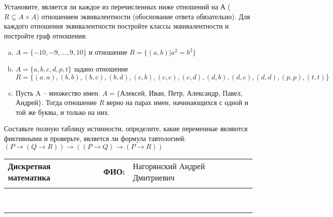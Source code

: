 \documentclass[10pt]{exam}
\newcommand{\class}{Дискретная математика}
\newcommand{\examdate}{}
\begin{document}
\begin{questions}
\question
Установите, является ли каждое из перечисленных ниже отношений на А ($R \subseteq A \times A$) отношением эквивалентности (обоснование ответа обязательно). Для каждого отношения эквивалентности постройте классы 
эквивалентности и постройте граф отношения:
\begin{enumerate} [a)]\setcounter{enumi}{0}
\item $A = \{-10, -9, … , 9, 10\}$ и отношение $R = \{(a,b)|a^{2} = b^{2}\}$
\item $A = \{a, b, c, d, p, t\}$ задано отношение $R = \{(a, a), (b, b), (b, c), (b, d), (c, b), (c, c), (c, d), (d, b), (d, c), (d, d), (p,p), (t,t)\}$
\item Пусть A – множество имен. $A = \{ $Алексей, Иван, Петр, Александр, Павел, Андрей$ \}$. Тогда отношение $R$ верно на парах имен, начинающихся с одной и той же буквы, и только на них.
\end{enumerate}\question Составьте полную таблицу истинности, определите, какие переменные являются фиктивными и проверьте, является ли формула тавтологией:
$(P \rightarrow (Q \rightarrow R)) \rightarrow ((P \rightarrow Q) \rightarrow (P \rightarrow R))$

\end{questions}
\newpage
\begin{flushright}
\begin{tabular}{p{2.8in} r l}
\textbf{\class} & \textbf{ФИО:} &Нагорянский Андрей Дмитриевич
\\

\textbf{\examdate} &&\\
\end{tabular}\\
\end{flushright}
\rule[1ex]{\textwidth}{.1pt}
\end{document}
